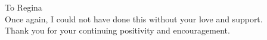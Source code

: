 

\begin{center}
	To Regina\\
	\bigskip
	Once again, I could not have done this without your love and support.\\
	Thank you for your continuing positivity and encouragement.\\
\end{center}

\restoregeometry